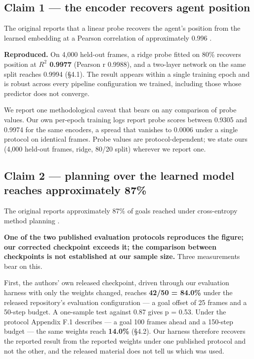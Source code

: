 \documentclass[10pt]{article}
\begin{document}
\subsection{Claim 1 --- the encoder recovers agent position}\label{claim-1-the-encoder-recovers-agent-position}

\medskip\noindent
The original reports that a linear probe recovers the agent's position from
the learned embedding at a Pearson correlation of approximately 0.996 \citep[Tab.~3, App.~F.2]{maes2026lewm}.
\medskip

\textbf{Reproduced.} On 4,000 held-out frames, a ridge probe fitted on 80\% recovers
position at \textbf{$R^{2}$ 0.9977} (Pearson r 0.9988), and a two-layer network on the
same split reaches 0.9994 (\S{}4.1). The result appears within a single training epoch and is robust
across every pipeline configuration we trained, including those whose predictor
does not converge.

We report one methodological caveat that bears on any comparison of probe
values. Our own per-epoch training logs report probe scores between 0.9305 and
0.9974 for the same encoders, a spread that vanishes to 0.0006 under a single protocol on identical frames. Probe values are protocol-dependent; we state ours
(4,000 held-out frames, ridge, 80/20 split) wherever we report one.

\subsection{Claim 2 --- planning over the learned model reaches approximately 87\%}\label{claim-2-planning-over-the-learned-model-reaches-approximately-87}

\medskip\noindent
The original reports approximately 87\% of goals reached under cross-entropy
method planning \citep[Fig.~6]{maes2026lewm}.
\medskip

\textbf{One of the two published evaluation protocols reproduces the figure; our
corrected checkpoint exceeds it; the comparison between checkpoints is not
established at our sample size.} Three measurements bear on this.

First, the authors' own released checkpoint, driven through our evaluation
harness with only the weights changed, reaches \textbf{42/50 = 84.0\%} under the
released repository's evaluation configuration --- a goal offset of 25 frames and
a 50-step budget. A one-sample test against 0.87 gives p = 0.53. Under the
protocol Appendix F.1 describes --- a goal 100 frames ahead and a 150-step budget
--- the same weights reach \textbf{14.0\%} (\S{}4.2). Our harness therefore recovers the
reported result from the reported weights under one published protocol and not
the other, and the released material does not tell us which was used.
\end{document}
